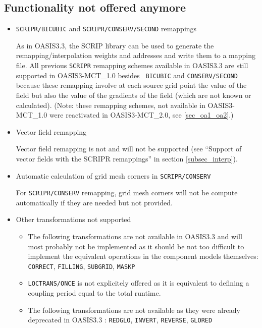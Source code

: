 \subsection{Functionality not offered anymore}
\label{sec_changes_old}

\begin{itemize}

\item {\tt SCRIPR/BICUBIC} and {\tt SCRIPR/CONSERV/SECOND} remappings

As in OASIS3.3, the SCRIP library can be used to generate the
  remapping/interpolation weights and addresses and write them to a
  mapping file. All previous {\tt SCRIPR} remapping
schemes available in OASIS3.3 are still supported in OASIS3-MCT\_1.0 besides {\tt
  BICUBIC} and {\tt CONSERV/SECOND} because these remapping involve
at each source grid point the value of the field but also the value of the
gradients of the field (which are not known or calculated). (Note: these remapping schemes,
not available in OASIS3-MCT\_1.0 were reactivated in OASIS3-MCT\_2.0, see \ref{sec_oa1_oa2}.)

\item Vector field remapping

Vector field remapping is not and will not be supported (see ``Support
  of vector fields with the SCRIPR remappings'' in section \ref{subsec_interp}).

\item Automatic calculation of grid mesh corners in {\tt SCRIPR/CONSERV}

For {\tt SCRIPR/CONSERV} remapping, grid mesh corners will not
  be compute automatically if they are needed but not provided.

\item Other transformations not supported

\begin{itemize}

\item The following transformations are not available in OASIS3.3
and will most probably not be implemented as it should be not
too difficult to implement the equivalent operations in the component
models themselves: {\tt CORRECT}, {\tt FILLING}, {\tt SUBGRID}, {\tt MASKP}

\item {\tt LOCTRANS/ONCE} is not explicitely offered as it is equivalent to
defining a coupling period equal to the total runtime.

\item The following transformations are not available as they were already
deprecated in OASIS3.3 : {\tt REDGLO}, {\tt INVERT},
{\tt REVERSE}, {\tt GLORED}


\end{itemize}
\end{itemize}
